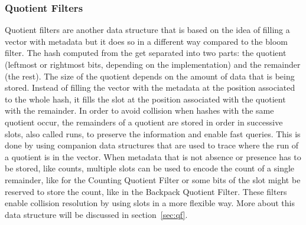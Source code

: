 \subsubsection{Quotient Filters}
Quotient filters are another data structure that is based on the idea of filling a vector with metadata but it does so in a different way compared to the bloom filter.
The hash computed from the \kmer get separated into two parts: the quotient (leftmost or rightmost bits, depending on the implementation) and the remainder (the rest). The size of the quotient depends on the amount of data that is being stored. Instead of filling the vector with the metadata at the position associated to the whole hash, it fills the slot at the position associated with the quotient with the remainder. In order to avoid collision when hashes with the same quotient occur, the remainders of a quotient are stored in order in successive slots, also called runs, to preserve the information and enable fast queries. This is done by using companion data structures that are used to trace where the run of a quotient is in the vector. When metadata that is not absence or presence has to be stored, like counts, multiple slots can be used to encode the count of a single remainder, like for the Counting Quotient Filter or some bits of the slot might be reserved to store the count, like in the Backpack Quotient Filter.
These filters enable collision resolution by using slots in a more flexible way. More about this data structure will be discussed in section~\ref{sec:qf}.

